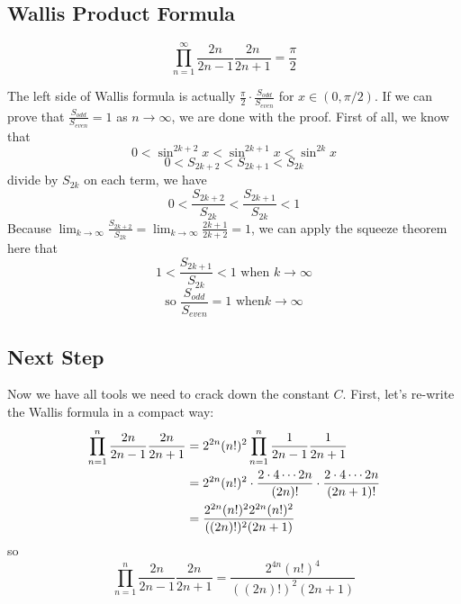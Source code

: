 \documentclass[11pt]{article}
\begin{document}
\subsection{\normalsize Wallis Product Formula}

\begin{tcolorbox} 
[colback=blue!5!white,  colframe=blue!75!black,  title= {\textbf{
Wallis Formula
} }]

$$ \prod _{n=1} ^{\infty } \frac{2n}{2n-1} \frac {2n}{2n+1} = \frac{\pi}{2} $$

\end{tcolorbox}

The left side of Wallis formula is actually $\displaystyle \frac{\pi}{2} \cdot \frac {S_{odd}}{S_{even}}$ for $x \in (0,  \pi/2)$.  If we can prove that  $\displaystyle \frac {S_{odd}}{S_{even}} = 1 $ as $ n \to \infty$,  we are done with the proof.  First of all,  we know that
$$ 0 < \sin ^{2k+2} x < \sin ^{2k+1} x < \sin ^{2k} x $$
$$ 0 < S_{2k+2} < S_{2k+1} < S_{2k} $$
divide by $S_{2k}$ on each term,  we have 
$$ 0 < \frac{S_{2k+2}}{S_{2k}} < \frac{ S_{2k+1} } {S_ {2k}} < 1 $$
Because $\displaystyle \lim _{k \to \infty} \frac{S_{2k+2}}{S_{2k}} = \lim _{k \to \infty} \frac{2k+1}{2k+2} = 1  $,  we can apply the squeeze theorem here that
$$ 1 < \frac{S_{2k+1}}{S_{2k}} < 1 \text {\ \ \ \ when } k \to \infty $$
$$ \text {so \  \ } \frac {S_{odd}}{S_{even} }= 1 \text {\  \  \  \  when} k \to \infty $$

\subsection{\normalsize Next Step}
Now we have all tools we need to crack down the constant $C$.  First,  let's re-write the Wallis formula in a compact way:
$$
\begin{aligned}[t]
 \prod _{n=1} ^{n } \frac{2n}{2n-1} \frac {2n}{2n+1}
    &= 2^{2n} (n!)^2  \prod _{n=1} ^{n } \frac{1}{2n-1} \frac{1}{2n+1}\\
    &= 2^{2n} (n!)^2 \cdot \frac{2 \cdot 4 \cdots 2n}{(2n)!} \cdot \frac{2 \cdot 4 \cdots 2n}{(2n+1)!}\\
    &= \frac{2^{2n} (n!)^2 2^{2n} (n!)^2} {((2n)!)^2 (2n+1)}\\
\end{aligned}\\
$$
so
\begin{equation}
 \prod _{n=1} ^{n } \frac{2n}{2n-1} \frac {2n}{2n+1} = \frac{2^{4n} (n!)^4} {((2n)!)^2 (2n+1)}
\end{equation}
\end{document}

